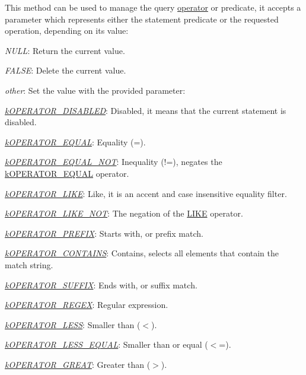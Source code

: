 This method can be used to manage the query \hyperlink{}{operator} or predicate, it accepts a parameter which represents either the statement predicate or the requested operation, depending on its value\-:


\begin{DoxyItemize}
\item {\itshape N\-U\-L\-L}\-: Return the current value. 
\item {\itshape F\-A\-L\-S\-E}\-: Delete the current value. 
\item {\itshape other}\-: Set the value with the provided parameter\-: 
\begin{DoxyItemize}
\item {\itshape \hyperlink{}{k\-O\-P\-E\-R\-A\-T\-O\-R\-\_\-\-D\-I\-S\-A\-B\-L\-E\-D}}\-: Disabled, it means that the current statement is disabled. 
\item {\itshape \hyperlink{}{k\-O\-P\-E\-R\-A\-T\-O\-R\-\_\-\-E\-Q\-U\-A\-L}}\-: Equality (=). 
\item {\itshape \hyperlink{}{k\-O\-P\-E\-R\-A\-T\-O\-R\-\_\-\-E\-Q\-U\-A\-L\-\_\-\-N\-O\-T}}\-: Inequality (!=), negates the \hyperlink{}{k\-O\-P\-E\-R\-A\-T\-O\-R\-\_\-\-E\-Q\-U\-A\-L} operator. 
\item {\itshape \hyperlink{}{k\-O\-P\-E\-R\-A\-T\-O\-R\-\_\-\-L\-I\-K\-E}}\-: Like, it is an accent and case insensitive equality filter. 
\item {\itshape \hyperlink{}{k\-O\-P\-E\-R\-A\-T\-O\-R\-\_\-\-L\-I\-K\-E\-\_\-\-N\-O\-T}}\-: The negation of the \hyperlink{}{L\-I\-K\-E} operator. 
\item {\itshape \hyperlink{}{k\-O\-P\-E\-R\-A\-T\-O\-R\-\_\-\-P\-R\-E\-F\-I\-X}}\-: Starts with, or prefix match. 
\item {\itshape \hyperlink{}{k\-O\-P\-E\-R\-A\-T\-O\-R\-\_\-\-C\-O\-N\-T\-A\-I\-N\-S}}\-: Contains, selects all elements that contain the match string. 
\item {\itshape \hyperlink{}{k\-O\-P\-E\-R\-A\-T\-O\-R\-\_\-\-S\-U\-F\-F\-I\-X}}\-: Ends with, or suffix match. 
\item {\itshape \hyperlink{}{k\-O\-P\-E\-R\-A\-T\-O\-R\-\_\-\-R\-E\-G\-E\-X}}\-: Regular expression. 
\item {\itshape \hyperlink{}{k\-O\-P\-E\-R\-A\-T\-O\-R\-\_\-\-L\-E\-S\-S}}\-: Smaller than ($<$). 
\item {\itshape \hyperlink{}{k\-O\-P\-E\-R\-A\-T\-O\-R\-\_\-\-L\-E\-S\-S\-\_\-\-E\-Q\-U\-A\-L}}\-: Smaller than or equal ($<$=). 
\item {\itshape \hyperlink{}{k\-O\-P\-E\-R\-A\-T\-O\-R\-\_\-\-G\-R\-E\-A\-T}}\-: Greater than ($>$). 

\end{DoxyItemize}
\end{DoxyItemize}
